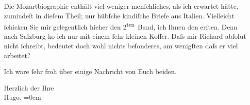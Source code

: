 \pstart
           Die Mozartbiographie enthält viel weniger
               menſchliches, als ich erwartet hätte, zumindeſt in dieſem Theil; nur hübſche
               kindiſche Briefe aus Italien. Vielleicht
               ſchicken Sie mir gelegentlich hieher den 2\textsuperscript{ten} Band, ich
               Ihnen {\pb}den erſten. Denn nach Salzburg ko{\geminationm} ich nur
               mit einem ſehr kleinen Koffer. Daſs mir Richard abſolut nicht ſchreibt, bedeutet doch wohl nichts beſonderes, am
               wenigſten daſs er viel arbeitet?\pend
           
\pstart
           Ich wäre ſehr froh über einige Nachricht von Euch beiden.\pend
           
\pstart
           Herzlich der Ihre{\\[\baselineskip]}\spacefill\mbox{Hugo.}\pend
           \leftskip=0em{}\endnumbering{}  
      